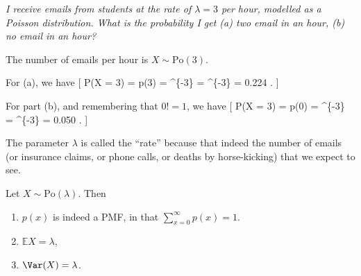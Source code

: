 \documentclass[
  letterpaper,
]{report}
\providecommand{\tightlist}{%
  \setlength{\itemsep}{0pt}\setlength{\parskip}{0pt}}\usepackage{longtable,booktabs,array}
\theoremstyle{definition}
\theoremstyle{definition}
\theoremstyle{remark}
\begin{document}
\emph{I receive emails from students at the rate of \(\lambda = 3\) per
hour, modelled as a Poisson distribution. What is the probability I get
(a) two email in an hour, (b) no email in an hour?}

The number of emails per hour is \(X \sim \mathrm{Po}(3)\).

For (a), we have {[} \mathbb P(X = 3) = p(3) = \^{}\{-3\}
 =  \^{}\{-3\} = 0.224 . {]}

For part (b), and remembering that \(0! = 1\), we have {[} \mathbb P(X =
3) = p(0) = \^{}\{-3\}  = \^{}\{-3\} =
0.050 . {]}

The parameter \(\lambda\) is called the ``rate'' because that indeed the
number of emails (or insurance claims, or phone calls, or deaths by
horse-kicking) that we expect to see.

Let \(X \sim \text{Po}(\lambda)\). Then

\begin{enumerate}
\def\labelenumi{\arabic{enumi}.}
\tightlist
\item
  \(p(x)\) is indeed a PMF, in that
  \(\displaystyle\sum_{x=0}^\infty p(x) = 1\).
\item
  \(\mathbb EX = \lambda\),
\item
  \(\Var(X) = \lambda\).
\end{enumerate}
\end{document}
